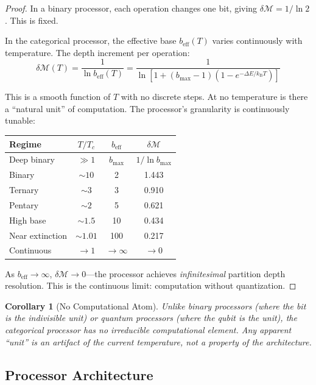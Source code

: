 \documentclass[twocolumn,10pt]{article}
\newtheorem{corollary}[theorem]{Corollary}
\theoremstyle{remark}
\newcommand{\kB}{k_{\mathrm{B}}}
\newcommand{\Depth}{\mathcal{M}}
\begin{document}
\begin{proof}
In a binary processor, each operation changes one bit, giving $\delta\Depth = 1 / \ln 2$. This is fixed.

In the categorical processor, the effective base $b_{\text{eff}}(T)$ varies continuously with temperature. The depth increment per operation:
\begin{equation}
    \delta\Depth(T) = \frac{1}{\ln b_{\text{eff}}(T)} = \frac{1}{\ln[1 + (b_{\max}-1)(1-e^{-\Delta E/\kB T})]}
\end{equation}

This is a smooth function of $T$ with no discrete steps. At no temperature is there a ``natural unit'' of computation. The processor's granularity is continuously tunable:

\begin{center}
\begin{tabular}{lccc}
\toprule
Regime & $T/T_c$ & $b_{\text{eff}}$ & $\delta\Depth$ \\
\midrule
Deep binary & $\gg 1$ & $b_{\max}$ & $1/\ln b_{\max}$ \\
Binary & $\sim 10$ & 2 & 1.443 \\
Ternary & $\sim 3$ & 3 & 0.910 \\
Pentary & $\sim 2$ & 5 & 0.621 \\
High base & $\sim 1.5$ & 10 & 0.434 \\
Near extinction & $\sim 1.01$ & 100 & 0.217 \\
Continuous & $\to 1$ & $\to \infty$ & $\to 0$ \\
\bottomrule
\end{tabular}
\end{center}

As $b_{\text{eff}} \to \infty$, $\delta\Depth \to 0$---the processor achieves \emph{infinitesimal} partition depth resolution. This is the continuous limit: computation without quantization.
\end{proof}

\begin{corollary}[No Computational Atom]
\label{cor:no_atom}
Unlike binary processors (where the bit is the indivisible unit) or quantum processors (where the qubit is the unit), the categorical processor has no irreducible computational element. Any apparent ``unit'' is an artifact of the current temperature, not a property of the architecture.
\end{corollary}

\subsection{Processor Architecture}
\end{document}
